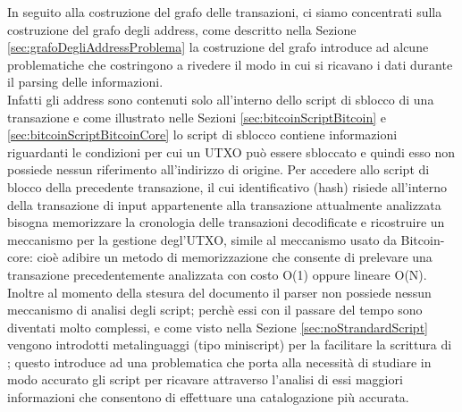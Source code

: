 In seguito alla costruzione del grafo delle transazioni, ci siamo concentrati sulla costruzione del grafo degli address, come descritto nella Sezione \ref{sec:grafoDegliAddressProblema} la costruzione del grafo introduce ad alcune problematiche che costringono a rivedere il modo in cui si ricavano i dati durante il parsing delle informazioni.\\
Infatti gli address sono contenuti solo all'interno dello script di sblocco di una transazione e come illustrato nelle Sezioni \ref{sec:bitcoinScriptBitcoin} e \ref{sec:bitcoinScriptBitcoinCore} lo script di sblocco contiene informazioni riguardanti le condizioni per cui un UTXO può essere sbloccato e quindi esso non possiede nessun riferimento all'indirizzo di origine.
Per accedere allo script di blocco della precedente transazione, il cui identificativo (hash) risiede all'interno della transazione di input appartenente alla transazione attualmente analizzata bisogna memorizzare la cronologia delle transazioni decodificate e ricostruire un meccanismo per la gestione degl'UTXO, simile al meccanismo usato da Bitcoin-core: cioè adibire un metodo di memorizzazione che consente di prelevare una transazione precedentemente analizzata con costo O(1) oppure lineare O(N).\\
Inoltre al momento della stesura del documento il parser non possiede nessun meccanismo di analisi degli script; perchè essi con il passare del tempo sono diventati molto complessi, e come visto nella Sezione \ref{sec:noStrandardScript} vengono introdotti metalinguaggi (tipo miniscript) per la facilitare la scrittura di ; questo introduce ad una problematica che porta alla necessità di studiare in modo accurato gli script per ricavare attraverso l'analisi di essi maggiori informazioni che consentono di effettuare una catalogazione più accurata.
